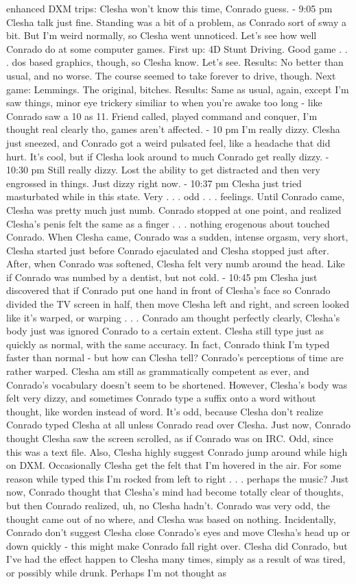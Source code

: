 \documentclass[12pt]{book}
\begin{document}
enhanced DXM trips: Clesha won't know this time, Conrado guess. - 9:05 pm Clesha talk just fine. Standing was a bit of a problem, as Conrado sort of sway a bit. But I'm weird normally, so Clesha went unnoticed. Let's see how well Conrado do at some computer games. First up: 4D Stunt Driving. Good game . . .  dos based graphics, though, so Clesha know. Let's see. Results: No better than usual, and no worse. The course seemed to take forever to drive, though. Next game: Lemmings. The original, bitches. Results: Same as usual, again, except I'm saw things, minor eye trickery similiar to when you're awake too long - like Conrado saw a 10 as 11. Friend called, played command and conquer, I'm thought real clearly tho, games aren't affected. - 10 pm I'm really dizzy. Clesha just sneezed, and Conrado got a weird pulsated feel, like a headache that did hurt. It's cool, but if Clesha look around to much Conrado get really dizzy. - 10:30 pm Still really dizzy. Lost the ability to get distracted and then very engrossed in things. Just dizzy right now. - 10:37 pm Clesha just tried masturbated while in this state. Very . . .  odd . . .  feelings. Until Conrado came, Clesha was pretty much just numb. Conrado stopped at one point, and realized Clesha's penis felt the same as a finger . . .  nothing erogenous about touched Conrado. When Clesha came, Conrado was a sudden, intense orgasm, very short, Clesha started just before Conrado ejaculated and Clesha stopped just after. After, when Conrado was softened, Clesha felt very numb around the head. Like if Conrado was numbed by a dentist, but not cold. - 10:45 pm Clesha just discovered that if Conrado put one hand in front of Clesha's face so Conrado divided the TV screen in half, then move Clesha left and right, and screen looked like it's warped, or warping . . .  Conrado am thought perfectly clearly, Clesha's body just was ignored Conrado to a certain extent. Clesha still type just as quickly as normal, with the same accuracy. In fact, Conrado think I'm typed faster than normal - but how can Clesha tell? Conrado's perceptions of time are rather warped. Clesha am still as grammatically competent as ever, and Conrado's vocabulary doesn't seem to be shortened. However, Clesha's body was felt very dizzy, and sometimes Conrado type a suffix onto a word without thought, like worden instead of word. It's odd, because Clesha don't realize Conrado typed Clesha at all unless Conrado read over Clesha. Just now, Conrado thought Clesha saw the screen scrolled, as if Conrado was on IRC. Odd, since this was a text file. Also, Clesha highly suggest Conrado jump around while high on DXM. Occasionally Clesha get the felt that I'm hovered in the air. For some reason while typed this I'm rocked from left to right . . .  perhaps the music? Just now, Conrado thought that Clesha's mind had become totally clear of thoughts, but then Conrado realized, uh, no Clesha hadn't. Conrado was very odd, the thought came out of no where, and Clesha was based on nothing. Incidentally, Conrado don't suggest Clesha close Conrado's eyes and move Clesha's head up or down quickly - this might make Conrado fall right over. Clesha did Conrado, but I've had the effect happen to Clesha many times, simply as a result of was tired, or possibly while drunk. Perhaps I'm not thought as 
\end{document}
